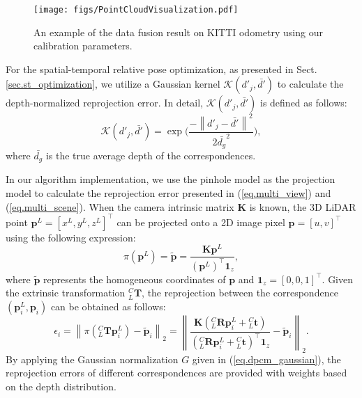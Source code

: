 \begin{figure*}[t!]
    \centering
    \texttt{[image: figs/PointCloudVisualization.pdf]}
    \caption{An example of the data fusion result on KITTI odometry using our calibration parameters.}
    \label{fig.exp_detail_datafusion_on_KITTI}
\end{figure*}

For the spatial-temporal relative pose optimization, as presented in Sect. \ref{sec.st_optimization}, we utilize a Gaussian kernel $\mathcal{K}(d'_{j},\bar{d'})$ to calculate the depth-normalized reprojection error. In detail, $\mathcal{K}(d'_{j},\bar{d'})$ is defined as follows:
\begin{equation}
\mathcal{K}(d'_{j},\bar{d'}) = \exp{ \bigg(\frac{ -\left\|{d'_{j}} - \bar{d'}\right\|^2 }{{2\bar{d_g}}^2} \bigg)},
\end{equation}
where $\bar{d_g}$ is the true average depth of the correspondences. 

In our algorithm implementation, we use the pinhole model as the projection model to calculate the reprojection error presented in (\ref{eq.multi_view}) and (\ref{eq.multi_scene}). When the camera intrinsic matrix $\boldsymbol{K}$ is known, the 3D LiDAR point $\boldsymbol{p}^{L}=[x^L,y^L,z^L]^\top$ can be projected onto a 2D image pixel $\boldsymbol{{p}} = [u,v]^\top$ using the following expression:
\begin{equation}
\pi(\boldsymbol{p}^{L}) = \tilde{\boldsymbol{p}} = \frac{\boldsymbol{K}\boldsymbol{p}^{L}}{(\boldsymbol{p}^{L})^\top\boldsymbol{1}_{z}},
\end{equation}
where $\tilde{\boldsymbol{p}}$ represents the homogeneous coordinates of $\boldsymbol{{p}}$ and $\boldsymbol{1}_{z}=[0,0,1]^\top$. Given the extrinsic transformation ${^C_L}\boldsymbol{T}$, the reprojection between the correspondence $(\boldsymbol{p}_{i}^L, \boldsymbol{p}_{i})$ can be obtained as follows:
\begin{equation}
\epsilon_i = \left\|\pi( {^C_L}\boldsymbol{T}\boldsymbol{p}_i^{L}) - \tilde{\boldsymbol{p}}_i  \right\|_2= \left\|\frac{\boldsymbol{K}({^{C}_{L}\boldsymbol{R}}\boldsymbol{p}_i^{L} + {^{C}_{L}\boldsymbol{t}})}{({^{C}_{L}\boldsymbol{R}}\boldsymbol{p}_i^{L} + {^{C}_{L}\boldsymbol{t}})^\top\boldsymbol{1}_{z}} - \tilde{\boldsymbol{p}}_i\right\|_2.
\end{equation}
By applying the Gaussian normalization $G$ given in (\ref{eq.dpcm_gaussian}), the reprojection errors of different correspondences are provided with weights based on the depth distribution.

